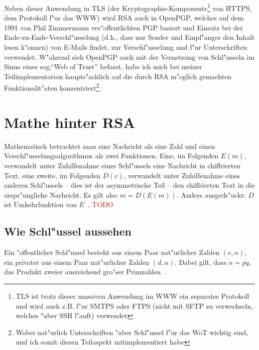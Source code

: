 \documentclass[12pt]{article}
\newcommand{\todo}[1]{\textcolor{red}{\mbox{TODO}}\marginpar{\textcolor{red}{#1}}}
\begin{document}
Neben dieser Anwendung in TLS (der Kryptographie-Komponente\footnote{
TLS ist trotz dieser massiven Anwendung im WWW ein separates Protokoll und wird auch z.B. f"ur SMTPS oder FTPS (nicht mit SFTP zu verwechseln, welches "uber SSH l"auft) verwendet}
von HTTPS, dem Protokoll f"ur das WWW) wird RSA auch in OpenPGP,
welches auf dem 1991 von Phil Zimmermann ver"offentlichten PGP basiert und Einsatz bei der Ende-zu-Ende-Verschl"usselung
(d.h., dass nur Sender und Empf"anger den Inhalt lesen k"on\-nen)
von E-Mails findet, zur Verschl"usselung und f"ur Unterschriften verwendet.
W"ah\-rend sich OpenPGP auch mit der Vernetzung von Schl"usseln im Sinne eines sog.\@ "`Web of Trust"' befasst,
habe ich mich bei meiner Teilimplementation haupts"achlich auf die durch RSA m"oglich gemachten
Funktionalit"aten konzentriert\footnote{Wobei nat"urlich Unterschriften "uber Schl"ussel f"ur das WoT wichtig sind, und ich somit diesen Teilaspekt mitimplementiert habe}.

\section{Mathe hinter RSA}

Mathematisch betrachtet man eine Nachricht als eine Zahl und einen
Ver\-schl"us\-sel\-ungs\-al\-go\-rith\-mus als zwei Funktionen.
Eine, im Folgenden $E(m)$, verwandelt unter Zuhilfenahme eines Schl"ussels eine
Nachricht in chiffrierten Text, eine zweite, im Folgenden $D(c)$,
verwandelt unter Zuhilfenahme eines anderen Schl"ussels -- dies ist der asymmetrische Teil --
den chiffrierten Text in die urspr"ungliche Nachricht.
Es gilt also $m = D(E(m))$.
Anders ausgedr"uckt: $D$ ist Umkehrfunktion von $E$~\cite{rsa}.
\todo{Hier irgendwo auch Unterschriften erw"ahnen?}

\subsection{Wie Schl"ussel aussehen}
\label{subsec:rsa:keys}

Ein "offentlicher Schl"ussel besteht aus einem Paar nat"urlicher Zahlen $(e, n)$,
ein privater aus einem Paar nat"urlicher Zahlen $(d, n)$.
Dabei gilt, dass $n = pq$, das Produkt zweier ausreichend gro"ser Primzahlen~\cite{rsa}.
\end{document}
